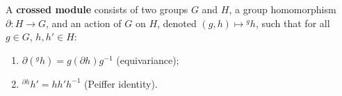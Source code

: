 A \textbf{crossed module} consists of two groups $G$ and $H$, a group homomorphism $\partial: H \rightarrow G$, and an action of $G$ on $H$, denoted $(g, h) \mapsto {}^{g}h$, such that for all $g \in G$, $h, h' \in H$:
\begin{enumerate}
\item $\partial({}^{g}h) = g(\partial h)g^{-1}$ (equivariance);
\item ${}^{\partial h}h' = h h' h^{-1}$ (Peiffer identity).
\end{enumerate}